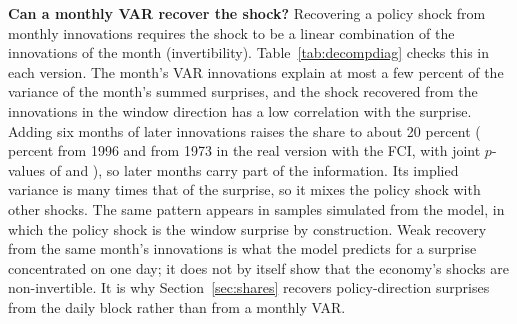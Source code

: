 \documentclass[11pt]{article}
\begin{document}
\begin{appendices}
\textbf{Can a monthly VAR recover the shock?} Recovering a policy shock from monthly innovations requires the shock to be a linear combination of the innovations of the month (invertibility). Table~\ref{tab:decompdiag} checks this in each version. The month's VAR innovations explain at most a few percent of the variance of the month's summed surprises, and the shock recovered from the innovations in the window direction has a low correlation with the surprise. Adding six months of later innovations raises the share to about 20 percent ( percent from 1996 and  from 1973 in the real version with the FCI, with joint $p$-values of  and ), so later months carry part of the information. Its implied variance is many times that of the surprise, so it mixes the policy shock with other shocks. The same pattern appears in samples simulated from the model, in which the policy shock is the window surprise by construction. Weak recovery from the same month's innovations is what the model predicts for a surprise concentrated on one day; it does not by itself show that the economy's shocks are non-invertible. It is why Section~\ref{sec:shares} recovers policy-direction surprises from the daily block rather than from a monthly VAR.





\FloatBarrier

\end{appendices}
\end{document}
